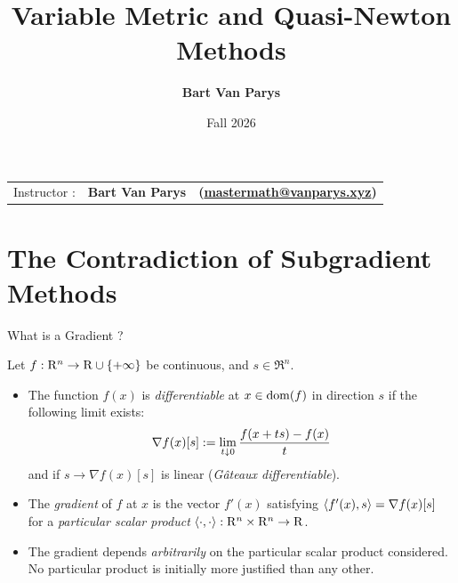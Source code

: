 \documentclass[9pt]{beamer}
\title[Continuous Optimization]{Variable Metric and Quasi-Newton Methods}
\author[]{\textbf{Bart Van Parys}}
\date[]{Fall 2026}
\begin{document}
\begin{frame}  

  \maketitle

  \vspace{-2em}
  
    \begin{center}
    \begin{tabular}{lll}
      Instructor : & \textbf{Bart Van Parys} & \textbf{(\href{mailto:mastermath@vanparys.xyz}{mastermath@vanparys.xyz})} \\
    \end{tabular}
  \end{center}
  
\end{frame}

\section{The Contradiction of Subgradient Methods}

\begin{frame}{What is a Gradient ?}

  Let $f : \mathrm{R}^n\to\mathrm{R}\cup\{+\infty\}$ be continuous, and $s\in\Re^n$.

  \vfill

  \begin{itemize}
    \setlength\itemsep{1.5em}
  \item The function $f(x)$ is \emph{differentiable} at $x \in \operatorname{dom}(f)$ in direction $s$ if the following limit exists:
    \[
      \nabla f(x) [s] := \lim_{t\downarrow 0} \frac{f(x+t s)-f(x)}{t}
    \]
    and if $s\to \nabla f(x) [s]$ is linear (\emph{G\^ateaux differentiable}).
  \item The \emph{gradient} of $f$ at $x$ is the vector $f'(x)$ satisfying $\left<f'(x), s\right> = \nabla f(x) [s]$ for a
    \emph{particular scalar product} $\left<\cdot, \cdot\right> : \mathrm{R}^n\times\mathrm{R}^n\to\mathrm{R}$.
  \item The gradient depends \emph{arbitrarily} on the particular scalar product considered. No particular product is initially more justified than any other.
  \end{itemize}
  
\end{frame}
\end{document}
